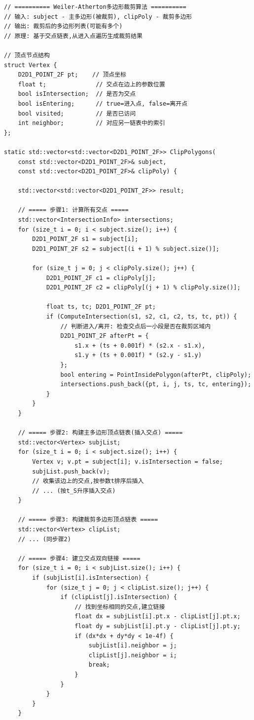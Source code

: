 \documentclass[12pt,a4paper]{article}
\begin{document}
\begin{tcolorbox}
\begin{lstlisting}[caption={Weiler-Atherton多边形裁剪算法核心实现}]
// ========== Weiler-Atherton多边形裁剪算法 ==========
// 输入: subject - 主多边形(被裁剪), clipPoly - 裁剪多边形
// 输出: 裁剪后的多边形列表(可能有多个)
// 原理: 基于交点链表,从进入点遍历生成裁剪结果

// 顶点节点结构
struct Vertex {
    D2D1_POINT_2F pt;    // 顶点坐标
    float t;              // 交点在边上的参数位置
    bool isIntersection;  // 是否为交点
    bool isEntering;      // true=进入点, false=离开点
    bool visited;         // 是否已访问
    int neighbor;         // 对应另一链表中的索引
};

static std::vector<std::vector<D2D1_POINT_2F>> ClipPolygons(
    const std::vector<D2D1_POINT_2F>& subject,
    const std::vector<D2D1_POINT_2F>& clipPoly) {
    
    std::vector<std::vector<D2D1_POINT_2F>> result;
    
    // ===== 步骤1: 计算所有交点 =====
    std::vector<IntersectionInfo> intersections;
    for (size_t i = 0; i < subject.size(); i++) {
        D2D1_POINT_2F s1 = subject[i];
        D2D1_POINT_2F s2 = subject[(i + 1) % subject.size()];
        
        for (size_t j = 0; j < clipPoly.size(); j++) {
            D2D1_POINT_2F c1 = clipPoly[j];
            D2D1_POINT_2F c2 = clipPoly[(j + 1) % clipPoly.size()];
            
            float ts, tc; D2D1_POINT_2F pt;
            if (ComputeIntersection(s1, s2, c1, c2, ts, tc, pt)) {
                // 判断进入/离开: 检查交点后一小段是否在裁剪区域内
                D2D1_POINT_2F afterPt = {
                    s1.x + (ts + 0.001f) * (s2.x - s1.x),
                    s1.y + (ts + 0.001f) * (s2.y - s1.y)
                };
                bool entering = PointInsidePolygon(afterPt, clipPoly);
                intersections.push_back({pt, i, j, ts, tc, entering});
            }
        }
    }
    
    // ===== 步骤2: 构建主多边形顶点链表(插入交点) =====
    std::vector<Vertex> subjList;
    for (size_t i = 0; i < subject.size(); i++) {
        Vertex v; v.pt = subject[i]; v.isIntersection = false;
        subjList.push_back(v);
        // 收集该边上的交点,按参数t排序后插入
        // ... (按t_S升序插入交点)
    }
    
    // ===== 步骤3: 构建裁剪多边形顶点链表 =====
    std::vector<Vertex> clipList;
    // ... (同步骤2)
    
    // ===== 步骤4: 建立交点双向链接 =====
    for (size_t i = 0; i < subjList.size(); i++) {
        if (subjList[i].isIntersection) {
            for (size_t j = 0; j < clipList.size(); j++) {
                if (clipList[j].isIntersection) {
                    // 找到坐标相同的交点,建立链接
                    float dx = subjList[i].pt.x - clipList[j].pt.x;
                    float dy = subjList[i].pt.y - clipList[j].pt.y;
                    if (dx*dx + dy*dy < 1e-4f) {
                        subjList[i].neighbor = j;
                        clipList[j].neighbor = i;
                        break;
                    }
                }
            }
        }
    }
    

\end{lstlisting}
\end{tcolorbox}
\end{document}
